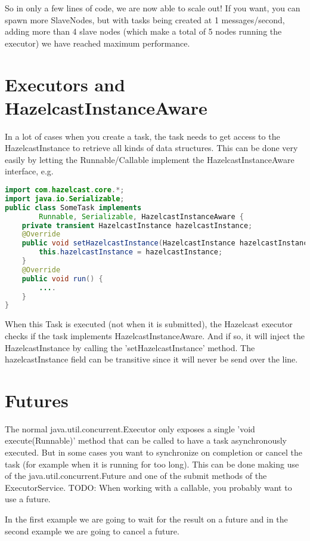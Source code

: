 So in only a few lines of code, we are now able to scale out! If you want, you can spawn more SlaveNodes, but with tasks being created at 1 messages/second, adding more than 4 slave nodes (which make a total of 5 nodes running the executor) we have reached maximum performance. 

\section{Executors and HazelcastInstanceAware}
In a lot of cases when you create a task, the task needs to get access to the HazelcastInstance to retrieve all kinds of data structures. This can be done very easily by letting the Runnable/Callable implement the HazelcastInstanceAware interface, e.g.

\begin{lstlisting}[language=java]
import com.hazelcast.core.*;
import java.io.Serializable;
public class SomeTask implements
        Runnable, Serializable, HazelcastInstanceAware {
    private transient HazelcastInstance hazelcastInstance;
    @Override
    public void setHazelcastInstance(HazelcastInstance hazelcastInstance) {
        this.hazelcastInstance = hazelcastInstance;
    }
    @Override
    public void run() {
        ....
    }
}
\end{lstlisting}
When this Task is executed (not when it is submitted), the Hazelcast executor checks if the task implements HazelcastInstanceAware. And if so, it will inject the HazelcastInstance by calling the 'setHazelcastInstance' method. The hazelcastInstance field can be transitive since it will never be send over the line. 

\section{Futures}
The normal java.util.concurrent.Executor only exposes a single 'void execute(Runnable)' method that can be called to have a task asynchronously executed. But in some cases you want to synchronize on completion or cancel the task (for example when it is running for too long). This can be done making use of the java.util.concurrent.Future and one of the submit methods of the ExecutorService. TODO: When working with a callable, you probably want to use a future.

In the first example we are going to wait for the result on a future and in the second example we are going to cancel a future.

